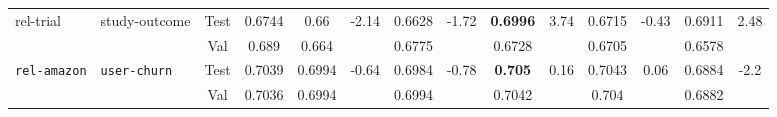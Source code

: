 \documentclass{article} %
\begin{document}
\begin{table}[ht]
{\begin{tabular}{llcc|cc|cc|cc|cc|cc}
\midrule
\multirow{2}{*}{rel-trial} & \multirow{2}{*}{study-outcome} & Test & 0.6744 & 0.66 & -2.14 & 0.6628 & -1.72 & \textbf{0.6996} & 3.74 & 0.6715 & -0.43 & 0.6911 & 2.48 \\ & & Val & 0.689 & 0.664 &  & 0.6775 &  & 0.6728 &  & 0.6705 &  & 0.6578 &  \\

\midrule
\multirow{2}{*}{\texttt{rel-amazon}} & \multirow{2}{*}{\texttt{user-churn}} & Test & 0.7039 & 0.6994 & -0.64 & 0.6984 & -0.78 & \textbf{0.705} & 0.16 & 0.7043 & 0.06 & 0.6884 & -2.2 \\ & & Val & 0.7036 & 0.6994 &  & 0.6994 &  & 0.7042 &  & 0.704 &  & 0.6882 &  \\


\bottomrule
\end{tabular}
}
\end{table}
\end{document}
